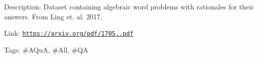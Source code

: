 Description\+: Dataset containing algebraic word problems with rationales for their answers. From Ling et. al. 2017,

Link\+: \href{https://arxiv.org/pdf/1705.04146.pdf}{\tt https\+://arxiv.\+org/pdf/1705..\+pdf}

Tags\+: \#\+A\+QuA, \#\+All, \#\+QA 